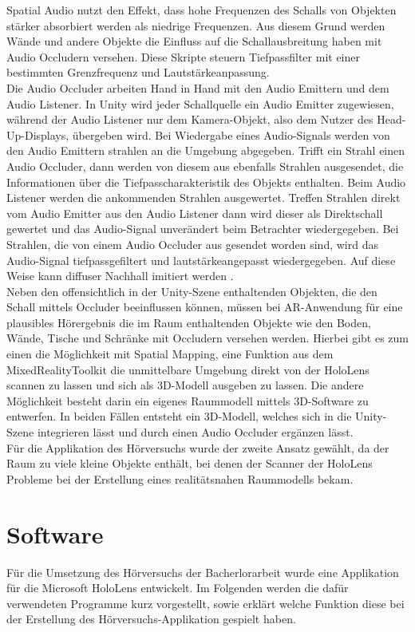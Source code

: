 Spatial Audio nutzt den Effekt, dass hohe Frequenzen des Schalls von Objekten stärker absorbiert werden als niedrige Frequenzen. Aus diesem Grund werden Wände und andere Objekte die Einfluss auf die Schallausbreitung haben mit Audio Occludern versehen. Diese Skripte steuern Tiefpassfilter mit einer bestimmten Grenzfrequenz und Lautstärkeanpassung. \\

Die Audio Occluder arbeiten Hand in Hand mit den Audio Emittern und dem Audio Listener. In Unity wird jeder Schallquelle ein Audio Emitter zugewiesen, während der Audio Listener nur dem Kamera-Objekt, also dem Nutzer des Head-Up-Displays, übergeben wird. Bei Wiedergabe eines Audio-Signals werden von den Audio Emittern strahlen an die Umgebung abgegeben. Trifft ein Strahl einen Audio Occluder, dann werden von diesem aus ebenfalls Strahlen ausgesendet, die Informationen über die Tiefpasscharakteristik des Objekts enthalten. Beim Audio Listener werden die ankommenden Strahlen ausgewertet. Treffen Strahlen direkt vom Audio Emitter aus den Audio Listener dann wird dieser als Direktschall gewertet und das Audio-Signal unverändert beim Betrachter wiedergegeben. Bei Strahlen, die von einem Audio Occluder aus gesendet worden sind, wird das Audio-Signal tiefpassgefiltert und lautstärkeangepasst wiedergegeben. Auf diese Weise kann diffuser Nachhall imitiert werden \cite{MSSpatialAudio}.\\

Neben den offensichtlich in der Unity-Szene enthaltenden Objekten, die den Schall mittels Occluder beeinflussen können, müssen bei AR-Anwendung für eine plausibles Hörergebnis die im Raum enthaltenden Objekte wie den Boden, Wände, Tische und Schränke mit Occludern versehen werden.
 Hierbei gibt es zum einen die Möglichkeit mit  Spatial Mapping, eine Funktion aus dem MixedRealityToolkit die unmittelbare Umgebung direkt von der HoloLens scannen zu lassen und sich als 3D-Modell ausgeben zu lassen.  Die andere Möglichkeit besteht darin ein eigenes Raummodell mittels 3D-Software zu entwerfen. In beiden Fällen entsteht ein 3D-Modell, welches sich in die Unity-Szene integrieren lässt und durch einen Audio Occluder ergänzen lässt. \\
 
 Für die Applikation des Hörversuchs wurde der zweite Ansatz gewählt, da der Raum zu viele kleine Objekte enthält, bei denen der Scanner der HoloLens Probleme bei der Erstellung eines realitätsnahen Raummodells bekam.  
 
 \section{Software}
 Für die Umsetzung des Hörversuchs der Bacherlorarbeit wurde eine Applikation für die Microsoft HoloLens entwickelt.  Im Folgenden werden  die dafür verwendeten Programme kurz vorgestellt, sowie erklärt welche Funktion diese bei der Erstellung des Hörversuchs-Applikation gespielt haben. 
 
